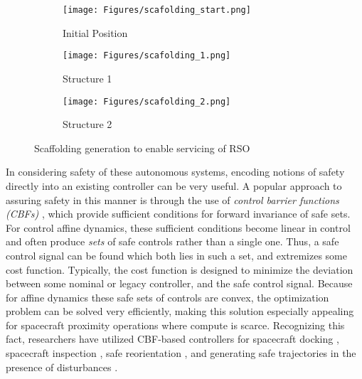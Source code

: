 \begin{figure}[t!]
     \begin{subfigure}[b]{0.32\textwidth}
        \centering
         \texttt{[image: Figures/scafolding\_start.png]}
         \caption{Initial Position}\label{fig:1a}
     \end{subfigure}   
     \begin{subfigure}[b]{0.33\textwidth}
        \centering
         \texttt{[image: Figures/scafolding\_1.png]}
         \caption{Structure 1}\label{fig:1b}
     \end{subfigure}
     \centering
     \begin{subfigure}[b]{0.31\textwidth}
        \centering
         \texttt{[image: Figures/scafolding\_2.png]}
         \caption{Structure 2}\label{fig:1c}
    \end{subfigure}
    \caption{Scaffolding generation to enable servicing of RSO}
    \label{fig:scafolding}
\end{figure}

In considering safety of these autonomous systems, encoding notions of safety directly into an existing controller can be very useful. A popular approach to assuring safety in this manner is through the use of \textit{control barrier functions (CBFs)} \cite{ames_2017,ames2019control}, which provide sufficient conditions for forward invariance of safe sets. For control affine dynamics, these sufficient conditions become linear in control and often produce \textit{sets} of safe controls rather than a single one. Thus, a safe control signal can be found which both lies in such a set, and extremizes some cost function. Typically, the cost function is designed to minimize the deviation between some nominal or legacy controller, and the safe control signal. Because for affine dynamics these safe sets of controls are convex, the optimization problem can be solved very efficiently, making this solution especially appealing for spacecraft proximity operations where compute is scarce. Recognizing this fact, researchers have utilized CBF-based controllers for spacecraft docking \cite{dunlap2021comparing,Breeden_2022_docking}, spacecraft inspection \cite{dunlap2023RTA_inspection,vanWijk2024JAIS,dunlap2024run,hibbard_guaranteeing_2022}, safe reorientation \cite{breeden_attitude}, and generating safe trajectories in the presence of disturbances \cite{breeden_robust_2023,vanWijk_DRbCBF_24}.

